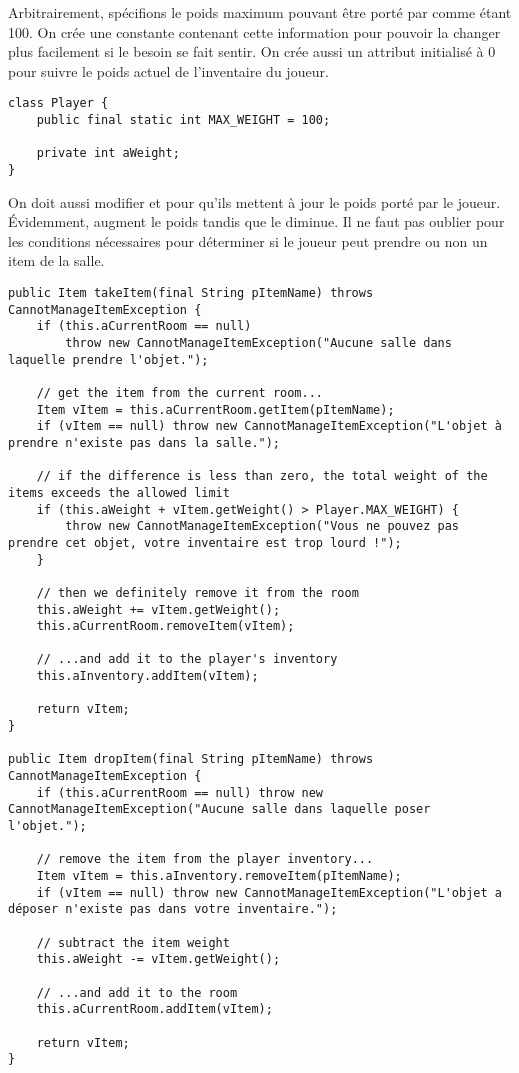 \begin{exercise}[subtitle=Poids maximum]

Arbitrairement, spécifions le poids maximum pouvant être porté par  comme étant 100. On crée une constante contenant cette information pour pouvoir la changer plus facilement si le besoin se fait sentir. On crée aussi un attribut initialisé à 0 pour suivre le poids actuel de l'inventaire du joueur.

\begin{verbatim}
class Player {
    public final static int MAX_WEIGHT = 100;

    private int aWeight;
}
\end{verbatim}

On doit aussi modifier  et  pour qu'ils mettent à jour le poids porté par le joueur. Évidemment,  augment le poids tandis que  le diminue. Il ne faut pas oublier pour  les conditions nécessaires pour déterminer si le joueur peut prendre ou non un item de la salle.

\begin{verbatim}
public Item takeItem(final String pItemName) throws CannotManageItemException {
    if (this.aCurrentRoom == null)
        throw new CannotManageItemException("Aucune salle dans laquelle prendre l'objet.");

    // get the item from the current room...
    Item vItem = this.aCurrentRoom.getItem(pItemName);
    if (vItem == null) throw new CannotManageItemException("L'objet à prendre n'existe pas dans la salle.");

    // if the difference is less than zero, the total weight of the items exceeds the allowed limit
    if (this.aWeight + vItem.getWeight() > Player.MAX_WEIGHT) {
        throw new CannotManageItemException("Vous ne pouvez pas prendre cet objet, votre inventaire est trop lourd !");
    }

    // then we definitely remove it from the room
    this.aWeight += vItem.getWeight();
    this.aCurrentRoom.removeItem(vItem);

    // ...and add it to the player's inventory
    this.aInventory.addItem(vItem);

    return vItem;
}

public Item dropItem(final String pItemName) throws CannotManageItemException {
    if (this.aCurrentRoom == null) throw new CannotManageItemException("Aucune salle dans laquelle poser l'objet.");

    // remove the item from the player inventory...
    Item vItem = this.aInventory.removeItem(pItemName);
    if (vItem == null) throw new CannotManageItemException("L'objet a déposer n'existe pas dans votre inventaire.");

    // subtract the item weight
    this.aWeight -= vItem.getWeight();

    // ...and add it to the room
    this.aCurrentRoom.addItem(vItem);

    return vItem;
}
\end{verbatim}
\end{exercise}

